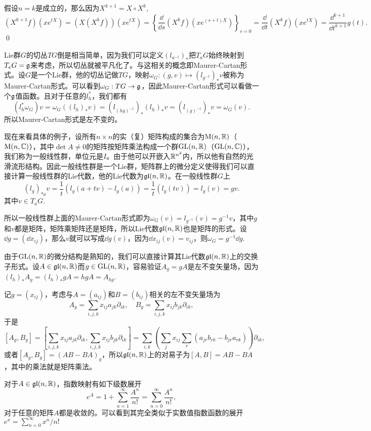 假设$n=k$是成立的，那么因为$X^{k+1}=X\circ X^k$,
\[
	(X^{k+1}f)(x e^{tX})=(X(X^{k}f))(x e^{tX})=\left\{\frac{\dd}{\dd s}(X^kf)(x e^{(s+t)X})\right\}_{s=0}=\frac{\dd}{\dd t}(X^kf)(x e^{tX})=\frac{\dd^{k+1}}{\dd t^{k+1}}g(t).
\]\qed

\para Lie群$G$的切丛$TG$倒是相当简单，因为我们可以定义$(l_{a^{-1}})_*$把$T_aG$始终映射到$T_eG={\mathfrak{g}}$来考虑，所以切丛就被平凡化了。与这相关的概念即Maurer-Cartan形式。设$G$是一个Lie群，他的切丛记做$TG$，映射$\omega_G:(g,v)\mapsto (l_{g^{-1}})_*v$被称为Maurer-Cartan形式。可以看到$\omega_G:TG\to {\mathfrak{g}}$，因此Maurer-Cartan形式可以看做一个${\mathfrak{g}}$值函数。且对于任意的$l_h^*$，我们都有
\[
(l_h^*\omega_G)v=\omega_G((l_h)_*v)=(l_{(hg)^{-1}})_*(l_h)_*v=(l_{(g)^{-1}})_*v=\omega_G(v).
\]
所以Maurer-Cartan形式是左不变的。

\para 现在来看具体的例子，设所有$n\times n$的实（复）矩阵构成的集合为$\mathrm{M}(n,\mathbb{R})$（$\mathrm{M}(n,\mathbb{C})$），其中$\det A\neq 0$的矩阵按矩阵乘法构成一个群$\mathrm{GL}(n,\mathbb{R})$（$\mathrm{GL}(n,\mathbb{C})$），我们称为一般线性群，单位元是$I$。由于他可以开嵌入$\mathbb{R}^{n^2}$内，所以他有自然的光滑流形结构。因此一般线性群是一个Lie群，矩阵群上的微分定义使得我们可以直接计算一般线性群的Lie代数，他的Lie代数为$\mathfrak{gl}(n,\mathbb{R})$。在一般线性群$G$上
\[
	(l_g)_{*a}v=\frac{1}{t}(l_g(a+tv)-l_g(a))
	=\frac{1}{t}(l_g(tv))=l_g(v)=gv.
\]
其中$v\in T_aG$.

所以一般线性群上面的Maurer-Cartan形式即为$\omega_G(v)=l_{g^{-1}}(v)=g^{-1}v$，其中$g$和$v$都是矩阵，矩阵乘矩阵还是矩阵，所以Lie代数$\mathfrak{gl}(n,\mathbb{R})$也是矩阵的形式。设$\dd g=(\dd x_{ij})$，那么$v$就可以写成$\dd g(v)$，因为$\dd x_{ij}(v)=v_{ij}$，则$\omega_G=g^{-1}\dd g$.

由于$\mathrm{GL}(n,\mathbb{R})$的微分结构是熟知的，我们可以直接计算其Lie代数$\mathfrak{gl}(n,\mathbb{R})$上的交换子形式。设$A\in\mathfrak{gl}(n,\mathbb{R})$而$g\in\mathrm{GL}(n,\mathbb{R})$，容易验证$A_g=gA$是左不变矢量场，因为$(l_h)_{*}A_g=(l_h)_{*}gA=hgA=A_{hg}$.

记$g=(x_{ij})$，考虑与$A=(a_{ij})$和$B=(b_{ij})$相关的左不变矢量场为
\[
A_g=\sum_{i,j,k}x_{ij}a_{jk}\partial_{ik},\quad B_g=\sum_{i,j,k}x_{ij}b_{jk}\partial_{ik},
\]
于是
\[
[A_g,B_g]=\left[\sum_{i,j,k}x_{ij}a_{jk}\partial_{ik},\sum_{i,j,k}x_{ij}b_{jk}\partial_{ik}\right]=\sum_{i,k}\left(\sum_{j}x_{ij}\sum_{r}(a_{jr}b_{rk}-b_{jr}a_{rk})\right)\partial_{ik},
\]
或者$[A_g,B_g]=(AB-BA)_g$，所以$\mathfrak{gl}(n,\mathbb{R})$上的对易子为$[A,B]=AB-BA$，其中的乘法就是矩阵乘法。

\para 对于$A\in\mathfrak{gl}(n,\mathbb{R})$，指数映射有如下级数展开
\[
	e^A=1+\sum_{n=1}^\infty \frac{A^n}{n!}=\sum_{n=0}^\infty \frac{A^n}{n!},
\]
对于任意的矩阵$A$都是收敛的。可以看到其完全类似于实数值指数函数的展开$e^x=\sum_{n=0}^\infty x^n/n!$

